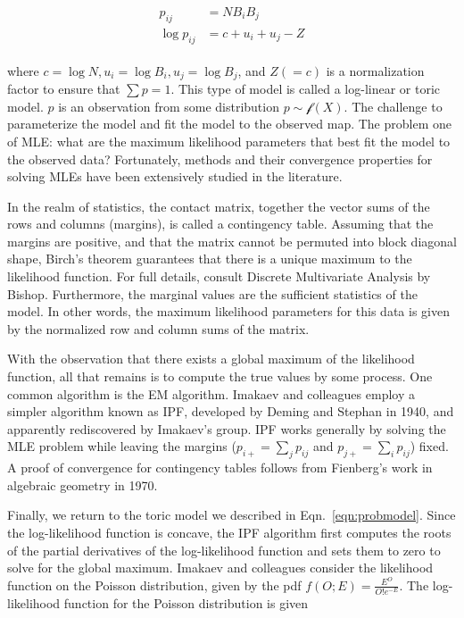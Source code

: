 \begin{align}
  \label{eqn:probmodel}
  \begin{split}
    p_{ij} &= NB_{i}B_{j}
    \\
    \log{p_{ij}} &=  c + u_i + u_j - Z
  \end{split}
\end{align}

where $c = \log{N}, u_i = \log{B_i}, u_j = \log{B_j}$, and $Z (= c)$ is a normalization factor to ensure that $\sum p = 1$.  This type of
model is called a \gls{log-linear} or \gls{toric model}.  $p$ is an observation from some distribution $p \sim \mathcal{f}(X)$.  The challenge to
parameterize the model and fit the model to the observed map.  The problem one of \gls{MLE}: what are the maximum likelihood parameters
that best fit the model to the observed data?  Fortunately, methods and their convergence properties for solving \glspl{MLE} have been extensively
studied in the literature\cite{fienberg2012, pachter2005}.

In the realm of statistics, the contact matrix, together the vector sums of the rows and columns (margins), is called a \gls{contingency table}.  Assuming
that the margins are positive, and that the matrix cannot be permuted into block diagonal shape, Birch's theorem guarantees that there is a
unique maximum to the likelihood function\cite{pachter2005,bishop1975}.  For full details, consult Discrete Multivariate Analysis by
Bishop\cite{bishop1975}.  Furthermore, the marginal values are the \glspl{sufficient statistic} of the model.  In other words, the maximum
likelihood parameters for this data is given by the normalized row and column sums of the matrix\cite{pachter2005}.

With the observation that there exists a global maximum of the likelihood function, all that remains is to compute the true values by some
process.  One common algorithm is the \gls{EM} algorithm\cite{fuchs1982}.  Imakaev and colleagues employ a simpler algorithm known as \gls{IPF},
developed by Deming and Stephan in 1940, and apparently rediscovered by Imakaev's group\cite{deming1940}.  \gls{IPF} works generally by solving
the \gls{MLE} problem while leaving the margins ($p_{i+} = \sum_{j}p_{ij}$ and $p_{j+} = \sum_{i}p_{ij}$) fixed.  A proof of convergence for contingency
tables follows from Fienberg's work in algebraic geometry in 1970\cite{fienberg1970}. %

Finally, we return to the \gls{toric model} we described in Eqn.~\eqref{eqn:probmodel}.  Since the log-likelihood function is concave, the \gls{IPF} algorithm first
computes the roots of the partial derivatives of the log-likelihood function and sets them to zero to solve for the global maximum.  Imakaev
and colleagues consider the likelihood function on the Poisson distribution, given by the \gls{pdf} $f(O;E) = \frac{E^{O}}{O!e^{-E}}$.  The
log-likelihood function for the Poisson distribution is given

